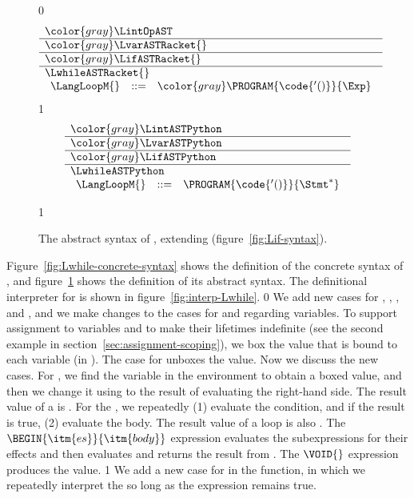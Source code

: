 \documentclass[7x10]{TimesAPriori_MIT}%
\newcommand{\gray}[1]{{\color{gray} #1}}
\def\racketEd{0}
\def\pythonEd{1}
\providecommand{\BookEdition}{1}
\let\edition\BookEdition
\newcommand{\pythonColor}[0]{}
\newcommand{\python}[1]{{\if\edition\pythonEd\pythonColor #1\fi}}
\numberwithin{theorem}{chapter}
\numberwithin{definition}{chapter}
\numberwithin{equation}{chapter}
\begin{document}
\begin{figure}[tp]
\centering
\begin{tcolorbox}[colback=white]
    \small
{\if\edition\racketEd    
\[
\begin{array}{l}
  \gray{\LintOpAST} \\ \hline
  \gray{\LvarASTRacket{}} \\ \hline
  \gray{\LifASTRacket{}} \\ \hline
  \LwhileASTRacket{} \\
\begin{array}{lcl}
  \LangLoopM{} &::=& \gray{ \PROGRAM{\code{'()}}{\Exp} }
\end{array}
\end{array}
\]
\fi}
{\if\edition\pythonEd\pythonColor
\[
\begin{array}{l}
  \gray{\LintASTPython} \\ \hline
  \gray{\LvarASTPython}  \\ \hline
  \gray{\LifASTPython} \\ \hline
  \LwhileASTPython \\
\begin{array}{lcl}
\LangLoopM{} &::=& \PROGRAM{\code{'()}}{\Stmt^{*}}
\end{array}
\end{array}
\]
\fi}
\end{tcolorbox}
\python{
  }
\caption{The abstract syntax of \LangLoop{}, extending \LangIf{} (figure~\ref{fig:Lif-syntax}).}
\label{fig:Lwhile-syntax}
\end{figure}

Figure~\ref{fig:Lwhile-concrete-syntax} shows the definition of the
concrete syntax of \LangLoop{}, and figure~\ref{fig:Lwhile-syntax}
shows the definition of its abstract syntax.
%
The definitional interpreter for \LangLoop{} is shown in
figure~\ref{fig:interp-Lwhile}.
%
{\if\edition\racketEd    
%
We add new cases for , , ,
and , and we make changes to the cases for  and
 regarding variables. To support assignment to variables and
to make their lifetimes indefinite (see the second example in
section~\ref{sec:assignment-scoping}), we box the value that is bound
to each variable (in ). The case for  unboxes the
value.
%
Now we discuss the new cases. For , we find the
variable in the environment to obtain a boxed value, and then we change
it using  to the result of evaluating the right-hand
side.  The result value of a  is .
%
For the , we repeatedly (1) evaluate the condition, and
if the result is true, (2) evaluate the body.
The result value of a  loop is also .
%
The $\BEGIN{\itm{es}}{\itm{body}}$ expression evaluates the
subexpressions  for their effects and then evaluates
and returns the result from .
%
The $\VOID{}$ expression produces the  value.
%
\fi}
{\if\edition\pythonEd\pythonColor
%
We add a new case for  in the 
function, in which we repeatedly interpret the  so long as the
 expression remains true.
%
\fi}
\end{document}
